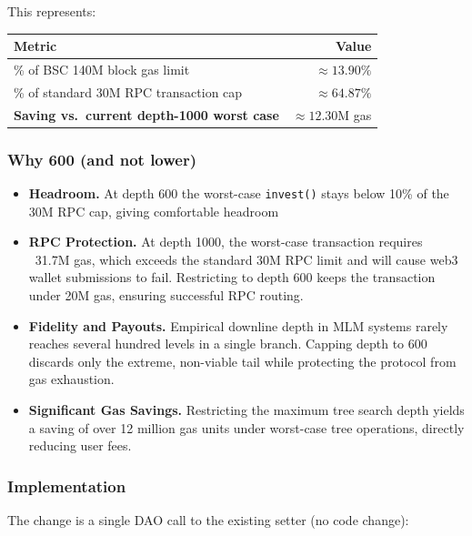 \documentclass[11pt,a4paper]{article}
\begin{document}
This represents:

\begin{center}
\renewcommand{\arraystretch}{1.3}
\begin{tabular}{p{6.5cm} r}
\toprule
\textbf{Metric} & \textbf{Value} \\
\midrule
\% of BSC 140M block gas limit                       & $\approx 13.90\%$ \\
\% of standard 30M RPC transaction cap               & $\approx 64.87\%$ \\
\textbf{Saving vs.\ current depth-1000 worst case} & $\approx 12.30$M gas \\
\bottomrule
\end{tabular}
\end{center}

\subsubsection*{Why 600 (and not lower)}

\begin{itemize}[leftmargin=*]
    \item \textbf{Headroom.} At depth 600 the worst-case \texttt{invest()}
          stays below 10\% of the 30M RPC cap, giving comfortable headroom
    \item \textbf{RPC Protection.} At depth 1000, the worst-case transaction requires ~31.7M gas, which exceeds the standard 30M RPC limit and will cause web3 wallet submissions to fail. Restricting to depth 600 keeps the transaction under 20M gas, ensuring successful RPC routing.
    \item \textbf{Fidelity and Payouts.} Empirical downline depth in MLM systems rarely reaches several hundred levels in a single branch. Capping depth to 600 discards only the extreme, non-viable tail while protecting the protocol from gas exhaustion.
    \item \textbf{Significant Gas Savings.} Restricting the maximum tree search depth yields a saving of over 12 million gas units under worst-case tree operations, directly reducing user fees.
\end{itemize}

\subsubsection*{Implementation}

The change is a single DAO call to the existing setter (no code change):
\end{document}
